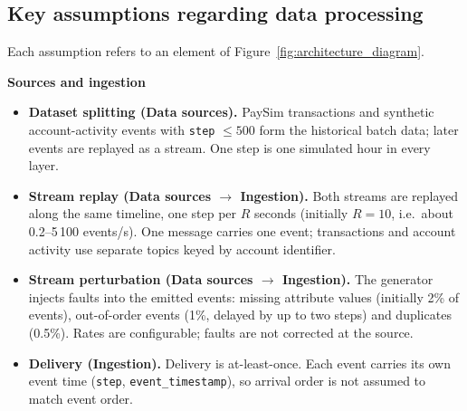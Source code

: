 \documentclass[titlepage]{article}
\begin{document}
\subsection{Key assumptions regarding data processing}
\label{sec:assumptions}
Each assumption refers to an element of Figure~\ref{fig:architecture_diagram}.

\noindent \textbf{Sources and ingestion}
\begin{itemize}
    \item \textbf{Dataset splitting (Data sources).} PaySim transactions and synthetic account-activity events with \texttt{step} $\le 500$ form the historical batch data; later events are replayed as a stream. One step is one simulated hour in every layer.
    \item \textbf{Stream replay (Data sources $\rightarrow$ Ingestion).} Both streams are replayed along the same timeline, one step per $R$ seconds (initially $R = 10$, i.e.\ about 0.2--5\,100 events/s). One message carries one event; transactions and account activity use separate topics keyed by account identifier.
    \item \textbf{Stream perturbation (Data sources $\rightarrow$ Ingestion).} The generator injects faults into the emitted events: missing attribute values (initially 2\% of events), out-of-order events (1\%, delayed by up to two steps) and duplicates (0.5\%). Rates are configurable; faults are not corrected at the source.
    \item \textbf{Delivery (Ingestion).} Delivery is at-least-once. Each event carries its own event time (\texttt{step}, \texttt{event\_timestamp}), so arrival order is not assumed to match event order.
\end{itemize}
\end{document}
